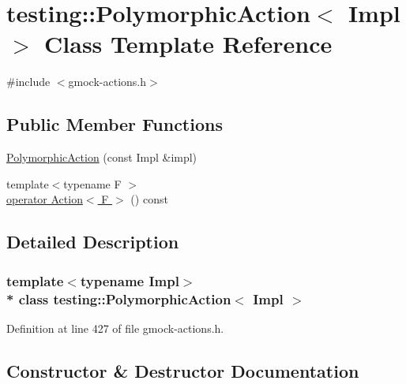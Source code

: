\hypertarget{classtesting_1_1_polymorphic_action}{}\section{testing\+:\+:Polymorphic\+Action$<$ Impl $>$ Class Template Reference}
\label{classtesting_1_1_polymorphic_action}


{\ttfamily \#include $<$gmock-\/actions.\+h$>$}

\subsection*{Public Member Functions}
\begin{DoxyCompactItemize}
\item 
\hyperlink{classtesting_1_1_polymorphic_action_a062e5a45ad61dcf8085b15cc882ca0ae}{Polymorphic\+Action} (const Impl \&impl)
\item 
{\footnotesize template$<$typename F $>$ }\\\hyperlink{classtesting_1_1_polymorphic_action_a40a074d559aceae2afcf53a305cfdcb5}{operator Action$<$ F $>$} () const 
\end{DoxyCompactItemize}


\subsection{Detailed Description}
\subsubsection*{template$<$typename Impl$>$\\*
class testing\+::\+Polymorphic\+Action$<$ Impl $>$}



Definition at line 427 of file gmock-\/actions.\+h.



\subsection{Constructor \& Destructor Documentation}
